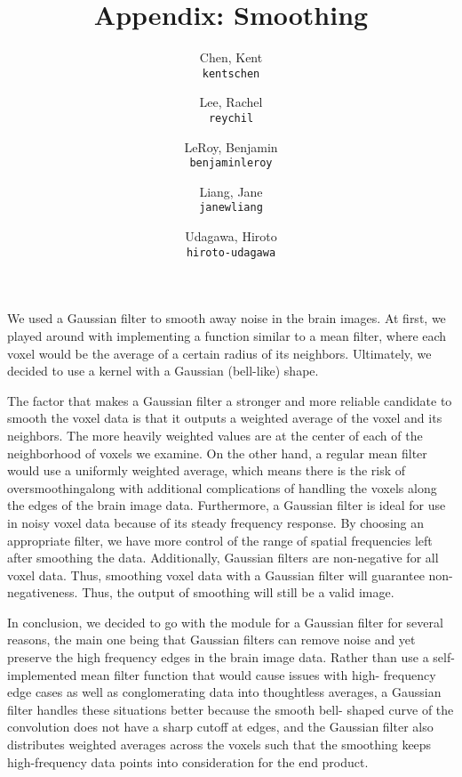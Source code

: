 \documentclass[11pt]{article}
\title{Appendix: Smoothing}
\author{
  Chen, Kent\\
  \texttt{kentschen}
  \and
  Lee, Rachel\\
  \texttt{reychil}
  \and
  LeRoy, Benjamin\\
  \texttt{benjaminleroy}
  \and
  Liang, Jane\\
  \texttt{janewliang}
  \and
  Udagawa, Hiroto\\
  \texttt{hiroto-udagawa}
}
\begin{document}
\maketitle

\par \indent We used a Gaussian filter to smooth away noise in the brain 
images. At first, we played around with implementing a function similar 
to a mean filter, where each voxel would be the average of a certain radius 
of its neighbors. Ultimately, we decided to use a kernel with a Gaussian 
(bell-like) shape. 
\par The factor that makes a Gaussian filter a stronger and more 
reliable candidate to smooth the voxel data is that it outputs a weighted 
average of the voxel and its neighbors. The more heavily weighted values are 
at the center of each of the neighborhood of voxels we examine. On the other 
hand, a regular mean filter would use a uniformly weighted average, which means
 there is the risk of oversmoothingalong with additional complications of 
handling the voxels along the edges of the brain image data. Furthermore, a
Gaussian filter is ideal for use in noisy voxel data 
because of its steady frequency response. By choosing an appropriate filter, 
we have more control of the range of spatial frequencies left after smoothing 
the data. Additionally, Gaussian filters are non-negative for all voxel data. 
Thus, smoothing voxel data with a Gaussian filter will guarantee non-
negativeness. Thus, the output of smoothing will still be a valid image.
\par In conclusion, we decided to go with the module for a Gaussian filter for 
several reasons, the main one being that Gaussian filters can remove noise and 
yet preserve the high frequency edges in the brain image data. Rather than use 
a self-implemented mean filter function that would cause issues with high-
frequency edge cases as well as conglomerating data into thoughtless averages, 
a Gaussian filter handles these situations better because the smooth bell-
shaped curve of the convolution does not have a sharp cutoff at edges, and the 
Gaussian filter also distributes weighted averages across the voxels such that 
the smoothing keeps high-frequency data points into consideration for the end 
product.

\end{document}
